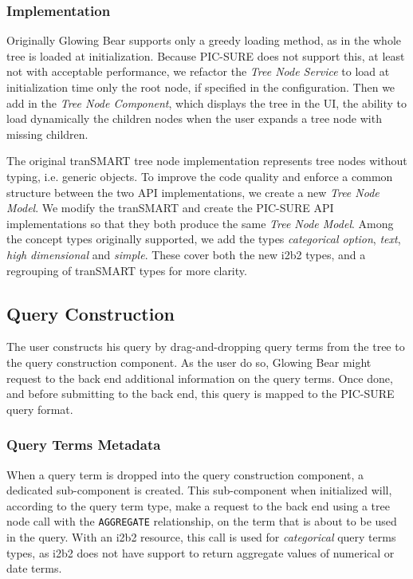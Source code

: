 \subsubsection*{Implementation}

Originally Glowing Bear supports only a greedy loading method, as in the whole tree is loaded at initialization.
Because PIC-SURE does not support this, at least not with acceptable performance, we refactor the \emph{Tree Node Service} to load at initialization time only the root node, if specified in the configuration.
Then we add in the \emph{Tree Node Component}, which displays the tree in the UI, the ability to load dynamically the children nodes when the user expands a tree node with missing children.

The original tranSMART tree node implementation represents tree nodes without typing, i.e. generic objects.
To improve the code quality and enforce a common structure between the two API implementations, we create a new \emph{Tree Node Model}.
We modify the tranSMART and create the PIC-SURE API implementations so that they both produce the same \emph{Tree Node Model}.
Among the concept types originally supported, we add the types \emph{categorical option}, \emph{text}, \emph{high dimensional} and \emph{simple}.
These cover both the new i2b2 types, and a regrouping of tranSMART types for more clarity.


\subsection{Query Construction}

The user constructs his query by drag-and-dropping query terms from the tree to the query construction component.
As the user do so, Glowing Bear might request to the back end additional information on the query terms.
Once done, and before submitting to the back end, this query is mapped to the PIC-SURE query format.

\subsubsection{Query Terms Metadata}

When a query term is dropped into the query construction component, a dedicated sub-component is created.
This sub-component when initialized will, according to the query term type, make a request to the back end using a tree node call with the \verb|AGGREGATE| relationship, on the term that is about to be used in the query.
With an i2b2 resource, this call is used for \emph{categorical} query terms types, as i2b2 does not have support to return aggregate values of numerical or date terms.

